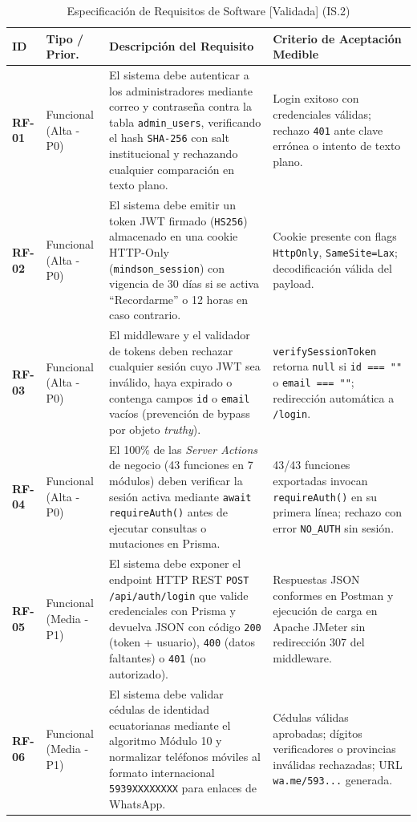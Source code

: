 \documentclass[11pt,a4paper]{article}
\begin{document}
\begin{table}[h!]
\centering
\caption{Especificación de Requisitos de Software [Validada] (IS.2)}
\label{tab:requisitos}
\renewcommand{\arraystretch}{1.25}
\begin{tabular}{@{}p{1.5cm}p{2.2cm}p{7.8cm}p{4.0cm}@{}}
\toprule
\rowcolor{tableHeader}
\textbf{ID} & \textbf{Tipo / Prior.} & \textbf{Descripción del Requisito} & \textbf{Criterio de Aceptación Medible} \\
\midrule
\textbf{RF-01} & Funcional (Alta - P0) & El sistema debe autenticar a los administradores mediante correo y contraseña contra la tabla \texttt{admin\_users}, verificando el hash \texttt{SHA-256} con salt institucional y rechazando cualquier comparación en texto plano. & Login exitoso con credenciales válidas; rechazo \texttt{401} ante clave errónea o intento de texto plano. \\
\textbf{RF-02} & Funcional (Alta - P0) & El sistema debe emitir un token JWT firmado (\texttt{HS256}) almacenado en una cookie HTTP-Only (\texttt{mindson\_session}) con vigencia de 30 días si se activa ``Recordarme'' o 12 horas en caso contrario. & Cookie presente con flags \texttt{HttpOnly}, \texttt{SameSite=Lax}; decodificación válida del payload. \\
\textbf{RF-03} & Funcional (Alta - P0) & El middleware y el validador de tokens deben rechazar cualquier sesión cuyo JWT sea inválido, haya expirado o contenga campos \texttt{id} o \texttt{email} vacíos (prevención de bypass por objeto \textit{truthy}). & \texttt{verifySessionToken} retorna \texttt{null} si \texttt{id === ""} o \texttt{email === ""}; redirección automática a \texttt{/login}. \\
\textbf{RF-04} & Funcional (Alta - P0) & El 100\% de las \textit{Server Actions} de negocio (43 funciones en 7 módulos) deben verificar la sesión activa mediante \texttt{await requireAuth()} antes de ejecutar consultas o mutaciones en Prisma. & 43/43 funciones exportadas invocan \texttt{requireAuth()} en su primera línea; rechazo con error \texttt{NO\_AUTH} sin sesión. \\
\textbf{RF-05} & Funcional (Media - P1) & El sistema debe exponer el endpoint HTTP REST \texttt{POST /api/auth/login} que valide credenciales con Prisma y devuelva JSON con código \texttt{200} (token + usuario), \texttt{400} (datos faltantes) o \texttt{401} (no autorizado). & Respuestas JSON conformes en Postman y ejecución de carga en Apache JMeter sin redirección 307 del middleware. \\
\textbf{RF-06} & Funcional (Media - P1) & El sistema debe validar cédulas de identidad ecuatorianas mediante el algoritmo Módulo 10 y normalizar teléfonos móviles al formato internacional \texttt{5939XXXXXXXX} para enlaces de WhatsApp. & Cédulas válidas aprobadas; dígitos verificadores o provincias inválidas rechazadas; URL \texttt{wa.me/593...} generada. \\

\end{tabular}
\end{table}
\end{document}
